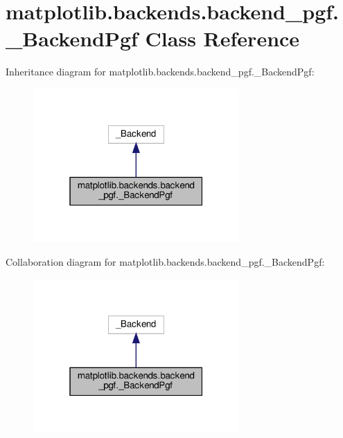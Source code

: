 \hypertarget{classmatplotlib_1_1backends_1_1backend__pgf_1_1__BackendPgf}{}\section{matplotlib.\+backends.\+backend\+\_\+pgf.\+\_\+\+Backend\+Pgf Class Reference}
\label{classmatplotlib_1_1backends_1_1backend__pgf_1_1__BackendPgf}


Inheritance diagram for matplotlib.\+backends.\+backend\+\_\+pgf.\+\_\+\+Backend\+Pgf\+:
\nopagebreak
\begin{figure}[H]
\begin{center}
\leavevmode
\includegraphics[width=223pt]{classmatplotlib_1_1backends_1_1backend__pgf_1_1__BackendPgf__inherit__graph}
\end{center}
\end{figure}


Collaboration diagram for matplotlib.\+backends.\+backend\+\_\+pgf.\+\_\+\+Backend\+Pgf\+:
\nopagebreak
\begin{figure}[H]
\begin{center}
\leavevmode
\includegraphics[width=223pt]{classmatplotlib_1_1backends_1_1backend__pgf_1_1__BackendPgf__coll__graph}
\end{center}
\end{figure}
